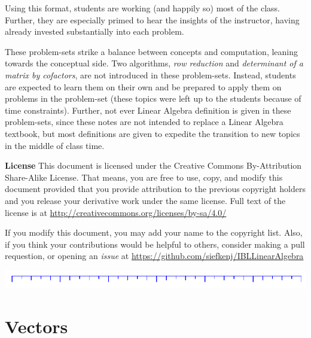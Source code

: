 \documentclass[letter]{article}
\begin{document}
Using this format, students are working (and happily so) most of the class.
Further, they are especially primed to hear the insights of the instructor, 
having already invested substantially into each problem.


These problem-sets strike a balance between concepts and computation, leaning towards
the conceptual side.  Two algorithms, \emph{row reduction} and \emph{determinant of
a matrix by cofactors}, are not introduced in these problem-sets.  Instead, students are
expected to learn them on their own and be prepared to apply them on problems in the
problem-set (these topics were left up to the students because of time constraints).
Further, not ever Linear Algebra definition is given in these problem-sets, since these
notes are not intended to replace a Linear Algebra textbook, but most definitions
are given to expedite the transition to new topics in the middle of class time.

{\bf License}  This document is licensed under the Creative Commons
By-Attribution Share-Alike License.  That means, you are free to use,
copy, and modify this document provided that you provide attribution
to the previous copyright holders and you release your derivative work 
under the same license.  Full text of the license is at \url{http://creativecommons.org/licenses/by-sa/4.0/}

If you modify this document, you may add your name to the copyright list.  Also,
if you think your contributions would be helpful to others, consider making a pull
requestion, or opening an \emph{issue} at 
\url{https://github.com/siefkenj/IBLLinearAlgebra}


\newpage
\setcounter{page}{1}
\pagestyle{fancy}
	\includegraphics{images/ruler.pdf}
\section*{Vectors}
\end{document}
